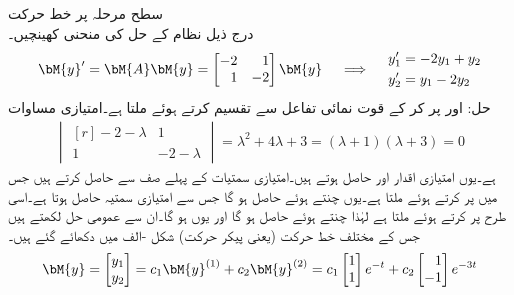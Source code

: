 \quad سطح مرحلہ پر خط حرکت\\
درج ذیل نظام کے حل کی منحنی کھینچیں۔
\begin{gather}\label{مساوات_نظام_خط_حرکت_الف}
\begin{aligned}
\bM{y}'=\bM{A}\bM{y}=\begin{bmatrix*}[r] -2& 1\\ 1&-2 \end{bmatrix*}\bM{y}
\end{aligned}\quad \implies \quad
\begin{aligned}
y_1'&=-2y_1+y_2\\
y_2'&=y_1-2y_2
\end{aligned}
\end{gather}
حل: اور  پر کر کے قوت نمائی تفاعل سے تقسیم کرتے ہوئے  ملتا ہے۔امتیازی مساوات
\begin{align*}
\begin{vmatrix*}[r]
-2-\lambda& 1\\
1& -2-\lambda
\end{vmatrix*}=\lambda^2+4\lambda+3=(\lambda+1)(\lambda+3)=0
\end{align*}
ہے۔یوں امتیازی اقدار  اور  حاصل ہوتے ہیں۔امتیازی سمتیات   کے پہلے صف  سے حاصل کرتے ہیں جس میں  پر کرتے ہوئے  ملتا ہے۔یوں  چنتے ہوئے  حاصل ہو گا جس سے امتیازی سمتیہ  حاصل ہوتا ہے۔اسی طرح  پر کرتے ہوئے  ملتا ہے لہٰذا  چنتے ہوئے  حاصل ہو گا اور یوں  ہو گا۔ان سے عمومی حل لکھتے ہیں جس کے مختلف خط حرکت (یعنی پیکر حرکت) شکل -الف میں دکھائے گئے ہیں۔
\begin{align*}
\bM{y}=\begin{bmatrix} y_1 \\y_2 \end{bmatrix}=c_1\bM{y}^{(1)}+c_2\bM{y}^{(2)}=c_1\begin{bmatrix} 1 \\ 1 \end{bmatrix}e^{-t}+c_2\begin{bmatrix*}[r] 1\\ -1 \end{bmatrix*}e^{-3t}
\end{align*}
